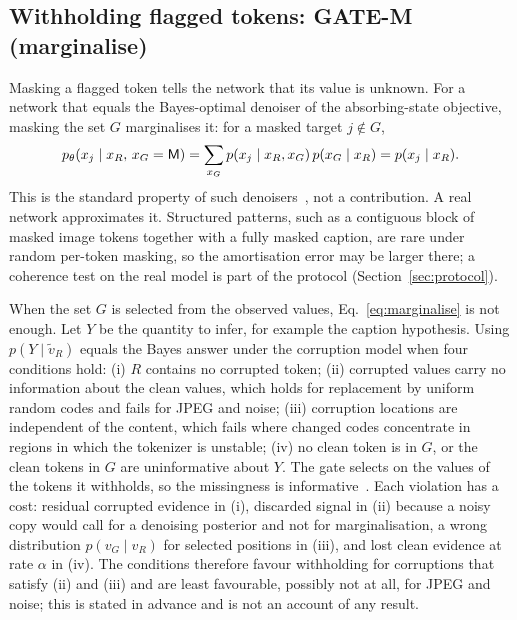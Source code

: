 \subsection{Withholding flagged tokens: GATE-M (marginalise)}\label{ssec:marginalise}
Masking a flagged token tells the network that its value is unknown.
For a network that equals the Bayes-optimal denoiser of the absorbing-state objective, masking the set $G$ marginalises it:
for a masked target $j\notin G$,
\begin{equation}
p_\theta(x_j\mid x_R,\,x_G=\mathsf{M})=\sum_{x_G}p(x_j\mid x_R,x_G)\,p(x_G\mid x_R)=p(x_j\mid x_R).
\label{eq:marginalise}
\end{equation}
This is the standard property of such denoisers~\cite{ou2025radd}, not a contribution.
A real network approximates it.
Structured patterns, such as a contiguous block of masked image tokens together with a fully masked caption, are rare under
random per-token masking, so the amortisation error may be larger there; a coherence test on the real model is part of the
protocol (Section~\ref{sec:protocol}).

When the set $G$ is selected from the observed values, Eq.~\eqref{eq:marginalise} is not enough.
Let $Y$ be the quantity to infer, for example the caption hypothesis.
Using $p(Y\mid\tilde v_R)$ equals the Bayes answer under the corruption model when four conditions hold:
(i) $R$ contains no corrupted token;
(ii) corrupted values carry no information about the clean values, which holds for replacement by uniform random codes
and fails for JPEG and noise;
(iii) corruption locations are independent of the content, which fails where changed codes concentrate in regions in which the
tokenizer is unstable;
(iv) no clean token is in $G$, or the clean tokens in $G$ are uninformative about $Y$.
The gate selects on the values of the tokens it withholds, so the missingness is informative~\cite{rubin1976inference}.
Each violation has a cost: residual corrupted evidence in (i), discarded signal in (ii) because a noisy copy would call for a
denoising posterior and not for marginalisation, a wrong distribution $p(v_G\mid v_R)$ for selected positions in (iii), and lost
clean evidence at rate $\alpha$ in (iv).
The conditions therefore favour withholding for corruptions that satisfy (ii) and (iii) and are least favourable, possibly
not at all, for JPEG and noise; this is stated in advance and is not an account of any result.

